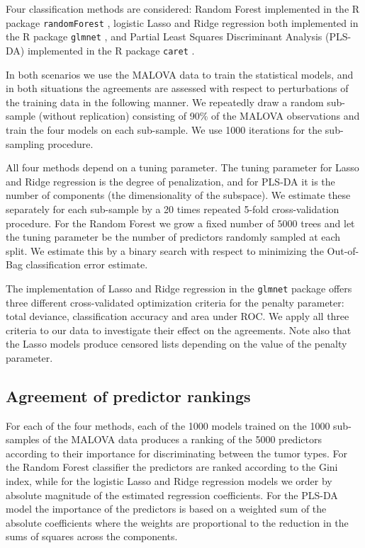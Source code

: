 \documentclass[12pt,a4paper]{article}
\theoremstyle{plain}
\begin{document}
Four classification methods are considered: Random Forest
\citep{breiman2001random} implemented in the R package
\texttt{randomForest} \citep{liaw2002classification}, logistic Lasso
\citep{tibshirani1996regression} and Ridge regression
\citep{segerstedt1992ordinary} both implemented in the R package
\texttt{glmnet} \citep{friedman2010regularization}, and Partial Least
Squares Discriminant Analysis (PLS-DA) \citep{boulesteix2004pls}
implemented in the R package \texttt{caret} \citep{Jed-Wing:2014aa}.

In both scenarios we use the MALOVA data to train the statistical
models, and in both situations the agreements are assessed with
respect to perturbations of the training data in the following
manner. We repeatedly draw a random sub-sample (without replication)
consisting of 90\% of the MALOVA observations and train the four
models on each sub-sample. We use 1000 iterations for the sub-sampling
procedure.

All four methods depend on a tuning parameter. The tuning parameter for
Lasso and Ridge regression is the degree of penalization, and for PLS-DA
it is the number of components (the dimensionality of the subspace).
We estimate these separately for each sub-sample by a 20 times repeated
5-fold cross-validation procedure. For the Random Forest we grow a fixed
number of $5000$ trees and let the tuning parameter be the number of
predictors randomly sampled at each split. We estimate this by a binary
search with respect to minimizing the Out-of-Bag classification error estimate.

The implementation of Lasso and Ridge regression in the
\texttt{glmnet} package offers three different cross-validated
optimization criteria for the penalty parameter: total deviance,
classification accuracy and area under ROC. We apply all three
criteria to our data to investigate their effect on the agreements.
Note also that the Lasso models produce censored lists depending on
the value of the penalty parameter.


\subsection{Agreement of predictor rankings}
For each of the four methods, each of the 1000 models trained on
the 1000 sub-samples of the MALOVA data produces a ranking of the 5000
predictors according to their importance for discriminating between
the tumor types. For the Random Forest classifier the predictors are ranked according
to the Gini index, while for the logistic Lasso and Ridge regression
models we order by absolute magnitude of the estimated
regression coefficients. For the PLS-DA model the importance of the
predictors is based on a weighted sum of the absolute coefficients
where the weights are proportional to the reduction in the sums of
squares across the components.
\end{document}
